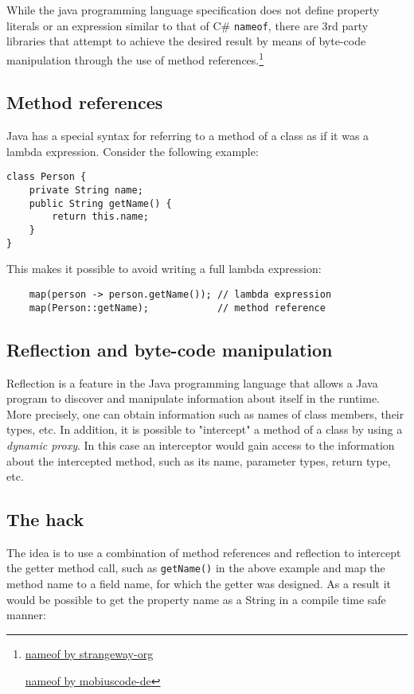 While the java programming language specification does not define property literals or an expression similar to that of C\# \texttt{nameof}, there are 3rd party libraries that attempt to achieve the desired result by means of byte-code manipulation through the use of method references.\footnote{\href{https://github.com/strangeway-org/nameof}{nameof by strangeway-org}

\; \; \href{https://github.com/mobiuscode-de/nameof}{nameof by mobiuscode-de}}


\subsection{Method references}
Java has a special syntax for referring to a method of a class as if it was a lambda expression. Consider the following example: 

\begin{verbatim}
class Person {
    private String name;
    public String getName() {
        return this.name;
    }
}
\end{verbatim}

This makes it possible to avoid writing a full lambda expression:
\begin{verbatim}
    map(person -> person.getName()); // lambda expression
    map(Person::getName);            // method reference
\end{verbatim}

\subsection{Reflection and byte-code manipulation}
Reflection is a feature in the Java programming language that allows a Java program to discover and manipulate information about itself in the runtime. More precisely, one can obtain information such as names of class members, their types, etc. In addition, it is possible to "intercept" a method of a class by using a \textit{dynamic proxy}. In this case an interceptor would gain access to the information about the intercepted method, such as its name, parameter types, return type, etc.

\subsection{The hack}
The idea is to use a combination of method references and reflection to intercept the getter method call, such as \texttt{getName()} in the above example and map the method name to a field name, for which the getter was designed. As a result it would be possible to get the property name as a String in a compile time safe manner:

